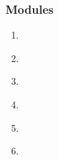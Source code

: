 \begin{frame}[fragile,label=outline] 
\frametitle{Modules}
\begin{center}
\begin{minipage}{3.25in}
\begin{enumerate}
\item  \hyperlink{s-intro<1>}      {\BUTTON {\orow{\sIntro}}} \\
\item  \hyperlink{s-present<1>}    {\BUTTON {\erow{\sPresent}}} \\
\item  \hyperlink{s-future<1>}     {\BUTTON {\orow{\sFuture}}} \\
\item  \hyperlink{s-project<1>}    {\BUTTON {\erow{\sProject}}} \\
\item  \hyperlink{s-starting<1>}   {\BUTTON {\orow{\sStarting}}} \\
\item  \hyperlink{s-parameters<1>} {\BUTTON {\erow{\sParameters}}} \\
\end{enumerate}
\end{minipage}
\end{center}
\end{frame}


  
  
  
  

  
  
  

  
  

  
  


